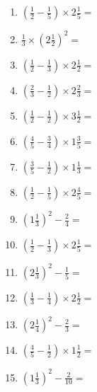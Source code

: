 \documentclass[12pt]{article}
\begin{document}
\begin{enumerate}
\item \large $ \left( \frac{1}{2} - \frac{1}{5} \right) \times 2 \frac{1}{5} = $ \vspace{1.6cm}
\item \large $ \frac{1}{3} \times \left( 2 \frac{1}{2} \right)^2 = $ \vspace{1.6cm}
\item \large $ \left( \frac{1}{2} - \frac{1}{3} \right) \times 2 \frac{1}{2} = $ \vspace{1.6cm}
\item \large $ \left( \frac{2}{3} - \frac{1}{2} \right) \times 2 \frac{2}{3} = $ \vspace{1.6cm}
\item \large $ \left( \frac{1}{2} - \frac{1}{2} \right) \times 3 \frac{1}{2} = $ \vspace{1.6cm}
\item \large $ \left( \frac{4}{5} - \frac{3}{4} \right) \times 1 \frac{3}{5} = $ \vspace{1.6cm}
\item \large $ \left( \frac{3}{5} - \frac{1}{2} \right) \times 1 \frac{1}{3} = $ \vspace{1.6cm}
\item \large $ \left( \frac{1}{2} - \frac{1}{5} \right) \times 2 \frac{4}{5} = $ \vspace{1.6cm}
\item \large $ \left( 1 \frac{1}{3} \right)^2 - \frac{2}{4} = $ \vspace{1.6cm}
\item \large $ \left( \frac{1}{2} - \frac{1}{3} \right) \times 2 \frac{1}{5} = $ \vspace{1.6cm}
\newpage
\item \large $ \left( 2 \frac{1}{3} \right)^2 - \frac{1}{5} = $ \vspace{1.6cm}
\item \large $ \left( \frac{1}{3} - \frac{1}{4} \right) \times 2 \frac{1}{2} = $ \vspace{1.6cm}
\item \large $ \left( 2 \frac{1}{4} \right)^2 - \frac{2}{3} = $ \vspace{1.6cm}
\item \large $ \left( \frac{4}{5} - \frac{1}{2} \right) \times 1 \frac{1}{2} = $ \vspace{1.6cm}
\item \large $ \left( 1 \frac{1}{3} \right)^2 - \frac{2}{10} = $ \vspace{1.6cm}

\end{enumerate}
\end{document}
